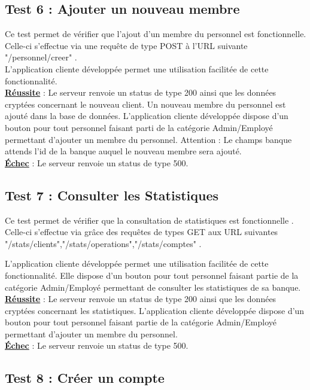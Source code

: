 \subsection{Test 6 : Ajouter un nouveau membre}

Ce test permet de vérifier que l'ajout d'un membre du personnel est fonctionnelle.
Celle-ci s'effectue via une requête de type POST à l'URL suivante "/personnel/creer" .
\\
L'application cliente développée permet une utilisation facilitée de cette fonctionnalité. 
\\
\textbf{\underline{Réussite}} : Le serveur renvoie un status de type 200 ainsi que les données cryptées concernant le nouveau client. Un nouveau membre du personnel est ajouté dans la base de données.
L'application cliente développée dispose d'un bouton pour tout personnel faisant parti de la catégorie Admin/Employé permettant d'ajouter un membre du personnel.
Attention : Le champs banque attends l'id de la banque auquel le nouveau membre sera ajouté.
\\
\textbf{\underline{Échec}} : Le serveur renvoie un status de type 500.

\subsection{Test 7 : Consulter les Statistiques}
Ce test permet de vérifier que la consultation de statistiques est fonctionnelle .
Celle-ci s'effectue via grâce des requêtes de types GET aux URL suivantes "/stats/clients","/stats/operations","/stats/comptes" .

L'application cliente développée permet une utilisation facilitée de cette fonctionnalité. 
Elle dispose d'un bouton pour tout personnel faisant partie de la catégorie Admin/Employé permettant de consulter les statistiques de sa banque.
\\
\textbf{\underline{Réussite}} : Le serveur renvoie un status de type 200 ainsi que les données cryptées concernant les statistiques.
L'application cliente développée dispose d'un bouton pour tout personnel faisant partie de la catégorie Admin/Employé permettant d'ajouter un membre du personnel.
\\
\textbf{\underline{Échec}} : Le serveur renvoie un status de type 500.

\subsection{Test 8 : Créer un compte }

